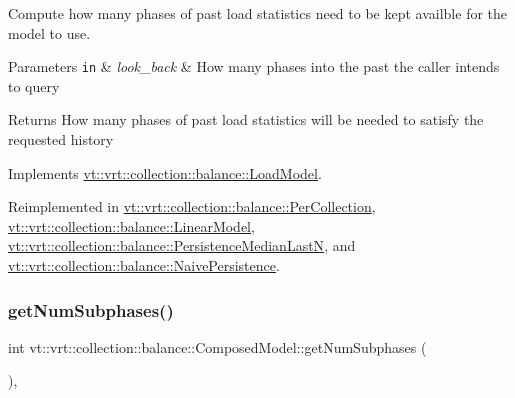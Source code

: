Compute how many phases of past load statistics need to be kept availble for the model to use. 


\begin{DoxyParams}[1]{Parameters}
\mbox{\tt in}  & {\em look\+\_\+back} & How many phases into the past the caller intends to query\\
\hline
\end{DoxyParams}
\begin{DoxyReturn}{Returns}
How many phases of past load statistics will be needed to satisfy the requested history 
\end{DoxyReturn}


Implements \hyperlink{classvt_1_1vrt_1_1collection_1_1balance_1_1_load_model_a8955e87a6225fbce0060318d9d1858dd}{vt\+::vrt\+::collection\+::balance\+::\+Load\+Model}.



Reimplemented in \hyperlink{structvt_1_1vrt_1_1collection_1_1balance_1_1_per_collection_aad4e752227fdf875194673cfb98e04e6}{vt\+::vrt\+::collection\+::balance\+::\+Per\+Collection}, \hyperlink{structvt_1_1vrt_1_1collection_1_1balance_1_1_linear_model_af21543dccfa23d2843a3b95b1ec15653}{vt\+::vrt\+::collection\+::balance\+::\+Linear\+Model}, \hyperlink{structvt_1_1vrt_1_1collection_1_1balance_1_1_persistence_median_last_n_a236ce9aa3fc3a38111160fc8c4a0e336}{vt\+::vrt\+::collection\+::balance\+::\+Persistence\+Median\+LastN}, and \hyperlink{structvt_1_1vrt_1_1collection_1_1balance_1_1_naive_persistence_abf20213225a6a25ed7cf119c7a86d834}{vt\+::vrt\+::collection\+::balance\+::\+Naive\+Persistence}.

\mbox{\label{classvt_1_1vrt_1_1collection_1_1balance_1_1_composed_model_af3ea09828c281d9c278198a19fe4e533}} 
\subsubsection{\texorpdfstring{get\+Num\+Subphases()}{getNumSubphases()}}
{\footnotesize\ttfamily int vt\+::vrt\+::collection\+::balance\+::\+Composed\+Model\+::get\+Num\+Subphases (\begin{DoxyParamCaption}{ }\end{DoxyParamCaption})\hspace{0.3cm}{\ttfamily [override]}, {\ttfamily [virtual]}}



